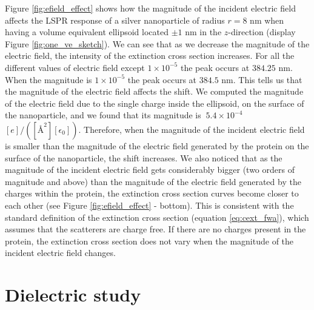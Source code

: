 Figure \ref{fig:efield_effect} shows how the magnitude of the incident electric field affects the LSPR response 
of a silver nanoparticle of radius $r=8$ nm when having a volume equivalent ellipsoid located 
$\pm 1$ nm in the $z$-direction (display Figure \ref{fig:one_ve_sketch}). We can see that as we decrease the magnitude of the electric field, 
the intensity of the extinction cross section increases. For all the different values of electric field except 
$1\times10^{-5}$ the peak occurs at $384.25$ nm. When the magnitude is $1\times10^{-5}$ the peak occurs at 
$384.5$ nm. This tells us that the magnitude of the electric field affects the shift. We computed 
the magnitude of the electric field due to the single charge inside the ellipsoid, on the surface of the nanoparticle,
and we found that its magnitude is $~5.4 \times 10^{-4}$ $[e]/([{\text{\AA}}^2][\epsilon_0])$. Therefore, 
when the magnitude of the incident electric field is smaller than the magnitude of the electric field generated by 
the protein on the surface of the nanoparticle, the shift increases. We also noticed that as the magnitude of the incident electric 
field gets considerably bigger (two orders of magnitude and above) than the magnitude of the electric field generated by the charges within the 
protein, the extinction cross section curves become closer to each other (see Figure \ref{fig:efield_effect} - bottom). This is
consistent with the standard definition of the extinction cross section (equation \ref{eq:cext_fwa}), which assumes that the scatterers are charge free. If 
there are no charges present in the protein, the extinction cross section does not vary when the magnitude of the incident electric field changes. 


\section{Dielectric study}\label{sec:diel_study}

